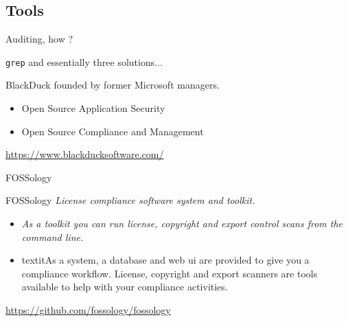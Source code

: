 \documentclass{beamer}
\begin{document}
\subsection{Tools}

\begin{frame}{Auditing, how ?}

\texttt{grep} and essentially three solutions...

\end{frame}


\begin{frame}{BlackDuck}
  founded by former Microsoft managers.

  \begin{itemize}
  \item Open Source Application Security
  \item Open Source Compliance and Management
  \end{itemize}

\url{https://www.blackducksoftware.com/}
\end{frame}


\begin{frame}{FOSSology}

\begin{block}{FOSSology}
\textit{License compliance software system and toolkit.}
\end{block}

\begin{itemize}
\item \textit{As a toolkit you can run license, copyright and export control scans from the command line.}

\item textit{As a system, a database and web ui are provided to give you a compliance workflow. License, copyright and export scanners are tools available to help with your compliance activities.}
\end{itemize}

\url{https://github.com/fossology/fossology}

\end{frame}

\begin{frame}[plain]%
%  
\end{frame}
\end{document}
